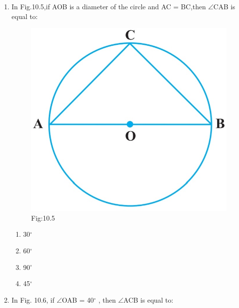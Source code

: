 \documentclass{article}
\begin{document}
\begin{enumerate}
\item In Fig.10.5,if AOB is a diameter of the circle and AC = BC,then $\angle$CAB is equal to:
\begin{figure}[H]
\centering
\includegraphics[width=\columnwidth]{Figs/10.5.jpg}
\caption*{Fig:10.5}
\end{figure}
\begin{enumerate}
\item 30$^{\circ}$
\item 60$^{\circ}$
\item 90$^{\circ}$
\item 45$^{\circ}$
\end{enumerate}
\item In Fig. 10.6, if $\angle$OAB = 40$^{\circ}$ , then $\angle$ACB is equal to:             
\begin{figure}[H]
\centering

\end{figure}
\end{enumerate}
\end{document}
